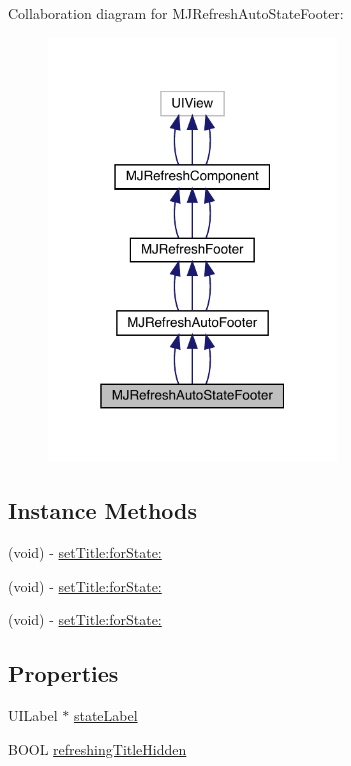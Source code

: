 Collaboration diagram for M\+J\+Refresh\+Auto\+State\+Footer\+:\nopagebreak
\begin{figure}[H]
\begin{center}
\leavevmode
\includegraphics[width=217pt]{interface_m_j_refresh_auto_state_footer__coll__graph}
\end{center}
\end{figure}
\subsection*{Instance Methods}
\begin{DoxyCompactItemize}
\item 
(void) -\/ \mbox{\hyperlink{interface_m_j_refresh_auto_state_footer_a112179db85e583c6d71c5bea7eb8f43f}{set\+Title\+:for\+State\+:}}
\item 
(void) -\/ \mbox{\hyperlink{interface_m_j_refresh_auto_state_footer_a112179db85e583c6d71c5bea7eb8f43f}{set\+Title\+:for\+State\+:}}
\item 
(void) -\/ \mbox{\hyperlink{interface_m_j_refresh_auto_state_footer_a112179db85e583c6d71c5bea7eb8f43f}{set\+Title\+:for\+State\+:}}
\end{DoxyCompactItemize}
\subsection*{Properties}
\begin{DoxyCompactItemize}
\item 
U\+I\+Label $\ast$ \mbox{\hyperlink{interface_m_j_refresh_auto_state_footer_a82e82d1a87d34b8213164a0b467f8389}{state\+Label}}
\item 
B\+O\+OL \mbox{\hyperlink{interface_m_j_refresh_auto_state_footer_a73ecb3dbec2c5dcb8bf2d766f0de8a66}{refreshing\+Title\+Hidden}}
\end{DoxyCompactItemize}

